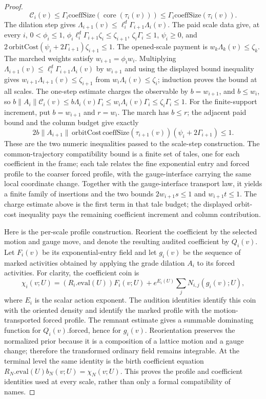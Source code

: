 \begin{proof}
\[
 \mathcal C_i(v)\leq\Gamma_i\mathrm{coeffSize}(\operatorname{core}(\tau_i(v)))
 \leq\Gamma_i\mathrm{coeffSize}(\tau_i(v)).
\]
The dilation step gives $\Lambda_{i+1}(v)\leq\ell_i^d\Gamma_{i+1}\Lambda_i(v)$. The paid scale data give, at every $i$, $0<\phi_i\leq1$, $\phi_i\ell_i^d\Gamma_{i+1}\zeta_i\leq\zeta_{i+1}$, $\zeta_i\Gamma_i\leq1$, $\psi_i\geq0$, and $2\,\mathrm{orbitCost}(\psi_i+2\Gamma_{i+1})\zeta_{i+1}\leq1$. The opened-scale payment is $w_k\Lambda_k(v)\leq\zeta_k$. The marched weights satisfy $w_{i+1}=\phi_iw_i$. Multiplying $\Lambda_{i+1}(v)\leq\ell_i^d\Gamma_{i+1}\Lambda_i(v)$ by $w_{i+1}$ and using the displayed bound inequality gives $w_{i+1}\Lambda_{i+1}(v)\leq\zeta_{i+1}$ from $w_i\Lambda_i(v)\leq\zeta_i$; induction proves the bound at all scales. The one-step estimate charges the observable by $b=w_{i+1}$, and $b\leq w_i$, so $b\|A_i\|\mathcal C_i(v)\leq b\Lambda_i(v)\Gamma_i\leq w_i\Lambda_i(v)\Gamma_i\leq\zeta_i\Gamma_i\leq1$. For the finite-support increment, put $b=w_{i+1}$ and $r=w_i$. The march has $b\leq r$; the adjacent paid bound and the column budget give exactly
\[
2b\|A_{i+1}\|\,\mathrm{orbitCost}\,\mathrm{coeffSize}(\tau_{i+1}(v))(\psi_i+2\Gamma_{i+1})\leq1.
\]
These are the two numeric inequalities passed to the scale-step construction. The common-trajectory compatibility bound is a finite set of tales, one for each coefficient in the frame; each tale relates the fine exponential entry and forced profile to the coarser forced profile, with the gauge-interface carrying the same local coordinate change. Together with the gauge-interface transport law, it yields a finite family of insertions and the two bounds $2w_{i+1}s\leq1$ and $w_{i+1}t\leq1$. The charge estimate above is the first term in that tale budget; the displayed orbit-cost inequality pays the remaining coefficient increment and column contribution.

Here is the per-scale profile construction. Reorient the coefficient by the selected motion and gauge move, and denote the resulting audited coefficient by $Q_i(v)$. Let $F_i(v)$ be its exponential-entry field and let $g_i(v)$ be the sequence of marked activities obtained by applying the grade dilation $A_i$ to its forced activities. For clarity, the coefficient coin is
\[
 \chi_i(v;U)= (R_i.\mathrm{eval}(U))F_i(v;U)
   + e^{E_i(U)}\sum_j N_{i,j}(g_i(v);U),
\]
where $E_i$ is the scalar action exponent. The audition identities identify this coin with the oriented density and identify the marked profile with the motion-transported forced profile. The remnant estimate gives a summable dominating function for $Q_i(v).\mathrm{forced}$, hence for $g_i(v)$. Reorientation preserves the normalized prior because it is a composition of a lattice motion and a gauge change; therefore the transformed ordinary field remains integrable. At the terminal level the same identity is the birth coefficient equation $R_N.\mathrm{eval}(U)b_N(v;U)=\chi_N(v;U)$. This proves the profile and coefficient identities used at every scale, rather than only a formal compatibility of names.


\end{proof}

